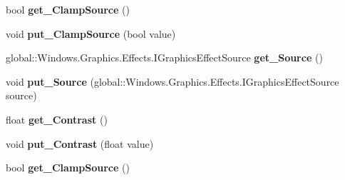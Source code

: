 \begin{DoxyCompactItemize}
\item 
\mbox{\label{interface_microsoft_1_1_graphics_1_1_canvas_1_1_effects_1_1_i_contrast_effect_a345ed8973aa3787da9976d5c7cf9031d}} 
bool {\bfseries get\+\_\+\+Clamp\+Source} ()
\item 
\mbox{\label{interface_microsoft_1_1_graphics_1_1_canvas_1_1_effects_1_1_i_contrast_effect_ae649f69d06226e09c126ed7788553c83}} 
void {\bfseries put\+\_\+\+Clamp\+Source} (bool value)
\item 
\mbox{\label{interface_microsoft_1_1_graphics_1_1_canvas_1_1_effects_1_1_i_contrast_effect_a98bcd363ec8c58d3079ab2528b82f5e1}} 
global\+::\+Windows.\+Graphics.\+Effects.\+I\+Graphics\+Effect\+Source {\bfseries get\+\_\+\+Source} ()
\item 
\mbox{\label{interface_microsoft_1_1_graphics_1_1_canvas_1_1_effects_1_1_i_contrast_effect_ac1bd8acb3ffbb5750d0523f240810481}} 
void {\bfseries put\+\_\+\+Source} (global\+::\+Windows.\+Graphics.\+Effects.\+I\+Graphics\+Effect\+Source source)
\item 
\mbox{\label{interface_microsoft_1_1_graphics_1_1_canvas_1_1_effects_1_1_i_contrast_effect_a10cb9dcb19b37c752c6823630ac1d388}} 
float {\bfseries get\+\_\+\+Contrast} ()
\item 
\mbox{\label{interface_microsoft_1_1_graphics_1_1_canvas_1_1_effects_1_1_i_contrast_effect_ac94c08df24985e960695d86aa7d6a379}} 
void {\bfseries put\+\_\+\+Contrast} (float value)
\item 
\mbox{\label{interface_microsoft_1_1_graphics_1_1_canvas_1_1_effects_1_1_i_contrast_effect_a345ed8973aa3787da9976d5c7cf9031d}} 
bool {\bfseries get\+\_\+\+Clamp\+Source} ()
\item 

\end{DoxyCompactItemize}
